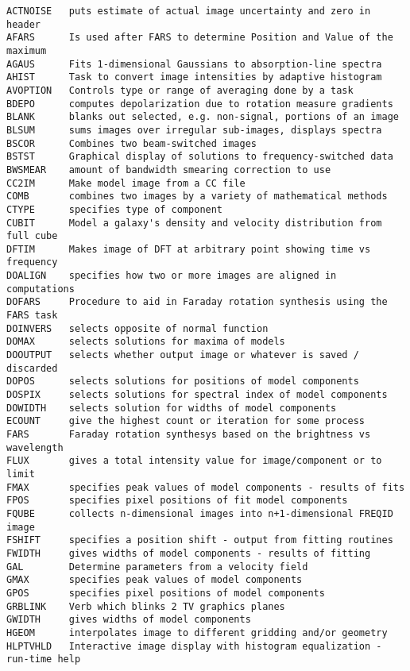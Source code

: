 
\vskip 0.5pt
\bbve\begin{verbatim}
ACTNOISE   puts estimate of actual image uncertainty and zero in header
AFARS      Is used after FARS to determine Position and Value of the maximum
AGAUS      Fits 1-dimensional Gaussians to absorption-line spectra
AHIST      Task to convert image intensities by adaptive histogram
AVOPTION   Controls type or range of averaging done by a task
BDEPO      computes depolarization due to rotation measure gradients
BLANK      blanks out selected, e.g. non-signal, portions of an image
BLSUM      sums images over irregular sub-images, displays spectra
BSCOR      Combines two beam-switched images
BSTST      Graphical display of solutions to frequency-switched data
BWSMEAR    amount of bandwidth smearing correction to use
CC2IM      Make model image from a CC file
COMB       combines two images by a variety of mathematical methods
CTYPE      specifies type of component
CUBIT      Model a galaxy's density and velocity distribution from full cube
DFTIM      Makes image of DFT at arbitrary point showing time vs frequency
DOALIGN    specifies how two or more images are aligned in computations
DOFARS     Procedure to aid in Faraday rotation synthesis using the FARS task
DOINVERS   selects opposite of normal function
DOMAX      selects solutions for maxima of models
DOOUTPUT   selects whether output image or whatever is saved / discarded
DOPOS      selects solutions for positions of model components
DOSPIX     selects solutions for spectral index of model components
DOWIDTH    selects solution for widths of model components
ECOUNT     give the highest count or iteration for some process
FARS       Faraday rotation synthesys based on the brightness vs wavelength
FLUX       gives a total intensity value for image/component or to limit
FMAX       specifies peak values of model components - results of fits
FPOS       specifies pixel positions of fit model components
FQUBE      collects n-dimensional images into n+1-dimensional FREQID image
FSHIFT     specifies a position shift - output from fitting routines
FWIDTH     gives widths of model components - results of fitting
GAL        Determine parameters from a velocity field
GMAX       specifies peak values of model components
GPOS       specifies pixel positions of model components
GRBLINK    Verb which blinks 2 TV graphics planes
GWIDTH     gives widths of model components
HGEOM      interpolates image to different gridding and/or geometry
HLPTVHLD   Interactive image display with histogram equalization - run-time help

\end{verbatim}
